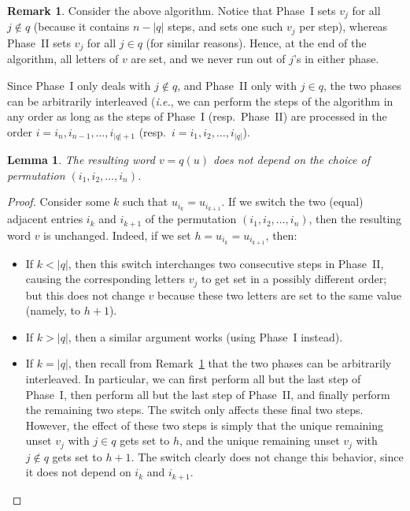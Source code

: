 \documentclass[reqno]{amsart}%
\newcommand{\0}{\phantom{c}}
\theoremstyle{plain}
\newtheorem{lemma}[thm]{Lemma}
\theoremstyle{definition}
\newtheorem{remark}[thm]{Remark}
\numberwithin{equation}{section}
\begin{document}
\begin{remark}
\label{rmk:order-agnostic} Consider the above algorithm. Notice that Phase~I
sets $v_{j}$ for all $j \notin q$ (because it contains $n - \left|  q \right|
$ steps, and sets one such $v_{j}$ per step), whereas Phase~II sets $v_{j}$
for all $j \in q$ (for similar reasons). Hence, at the end of the algorithm,
all letters of $v$ are set, and we never run out of $j$'s in either phase.

Since Phase~I only deals with $j \notin q$, and Phase~II only with $j\in q$,
the two phases can be arbitrarily interleaved (\textit{i.e.}, we can perform
the steps of the algorithm in any order as long as the steps of Phase~I
(resp.\ Phase~II) are processed in the order $i = i_{n}, i_{n-1}, \ldots,
i_{\left|  q \right|  +1}$ (resp.\ $i = i_{1}, i_{2}, \ldots, i_{\left|  q
\right|  }$).
\end{remark}

\begin{lemma}
\label{lemma:order_indep} The resulting word $v = q(u)$ does not depend on the
choice of permutation $(i_{1}, i_{2}, \dotsc, i_{n})$.
\end{lemma}

\begin{proof}
Consider some $k$ such that $u_{i_{k}} = u_{i_{k+1}}$. If we switch the two
(equal) adjacent entries $i_{k}$ and $i_{k+1}$ of the permutation $\left(
i_{1}, i_{2}, \ldots, i_{n} \right)  $, then the resulting word $v$ is
unchanged. Indeed, if we set $h = u_{i_{k}} = u_{i_{k+1}}$, then:

\begin{itemize}
\item If $k < \left|  q \right|  $, then this switch interchanges two
consecutive steps in Phase~II, causing the corresponding letters $v_{j}$ to
get set in a possibly different order; but this does not change $v$ because
these two letters are set to the same value (namely, to $h+1$).

\item If $k > \left|  q \right|  $, then a similar argument works (using
Phase~I instead).

\item If $k = \left|  q \right|  $, then recall from
Remark~\ref{rmk:order-agnostic} that the two phases can be arbitrarily
interleaved. In particular, we can first perform all but the last step of
Phase~I, then perform all but the last step of Phase~II, and finally perform
the remaining two steps. The switch only affects these final two steps.
However, the effect of these two steps is simply that the unique remaining
unset $v_{j}$ with $j \in q$ gets set to $h$, and the unique remaining unset
$v_{j}$ with $j \notin q$ gets set to $h+1$. The switch clearly does not
change this behavior, since it does not depend on $i_{k}$ and $i_{k+1}$.
\end{itemize}
\end{proof}
\end{document}
